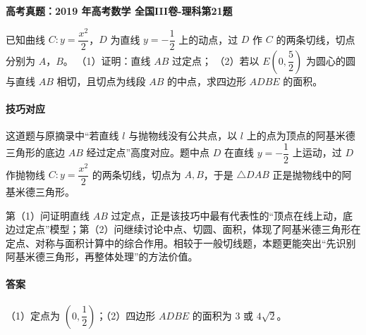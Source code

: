 \documentclass[UTF8,a4paper,11pt]{ctexart}
\newenvironment{gaokao}[1]{\par\medskip\noindent\textbf{高考真题：#1}\par\smallskip}{\par\medskip}
\begin{document}
\begin{gaokao}{2019 年高考数学 全国III卷-理科第21题}

已知曲线 $C: y=\dfrac{x^2}{2}$，$D$ 为直线 $y=-\dfrac{1}{2}$ 上的动点，过 $D$ 作 $C$ 的两条切线，切点分别为 $A$，$B$。
（1）证明：直线 $AB$ 过定点；
（2）若以 $E\left(0,\dfrac{5}{2}\right)$ 为圆心的圆与直线 $AB$ 相切，且切点为线段 $AB$ 的中点，求四边形 $ADBE$ 的面积。

\begin{center}


\end{center}

\paragraph{技巧对应}

这道题与原摘录中“若直线 $l$ 与抛物线没有公共点，以 $l$ 上的点为顶点的阿基米德三角形的底边 $AB$ 经过定点”高度对应。题中点 $D$ 在直线 $y=-\dfrac12$ 上运动，过 $D$ 作抛物线 $C:y=\dfrac{x^2}{2}$ 的两条切线，切点为 $A,B$，于是 $\triangle DAB$ 正是抛物线中的阿基米德三角形。

第（1）问证明直线 $AB$ 过定点，正是该技巧中最有代表性的“顶点在线上动，底边过定点”模型；第（2）问继续讨论中点、切圆、面积，体现了阿基米德三角形在定点、对称与面积计算中的综合作用。相较于一般切线题，本题更能突出“先识别阿基米德三角形，再整体处理”的方法价值。

\paragraph{答案}

（1）定点为 $\left(0,\dfrac{1}{2}\right)$；（2）四边形 $ADBE$ 的面积为 $3$ 或 $4\sqrt{2}$。


\end{gaokao}
\end{document}
